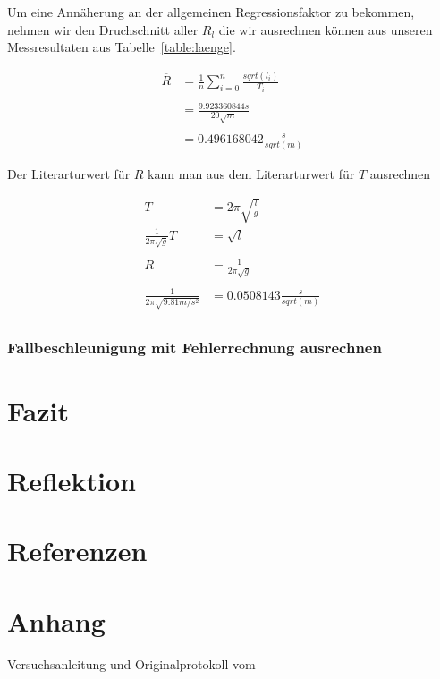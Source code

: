 \documentclass[12pt, a4paper, twoside]{article}
\begin{document}
Um eine Annäherung an der allgemeinen Regressionsfaktor zu bekommen,
nehmen wir den Druchschnitt aller $R_l$ die wir ausrechnen können aus unseren Messresultaten aus Tabelle~\ref{table:laenge}.

\begin{align*}
  \overline{R} & = \frac{1}{n}\sum_{i=0}^{n} \frac{sqrt(l_i)}{T_i} \\
  \\
               & = \frac{9.923360844s}{20\sqrt{m}}                 \\
  \\
               & = 0.496168042\frac{s}{sqrt(m)}
\end{align*}

\begin{center}
\end{center}

Der Literarturwert für $R$ kann man aus dem Literarturwert für $T$ ausrechnen

\begin{align*}
  T                               & = 2\pi \sqrt{\frac{l}{g}}    \\
  \frac{1}{2\pi \sqrt{g}}T        & = \sqrt{l}                   \\
  \\
  R                               & = \frac{1}{2\pi \sqrt{g}}    \\
  \\
  \frac{1}{2\pi \sqrt{9.81m/s^2}} & = 0.0508143\frac{s}{sqrt(m)} \\
\end{align*}

\subsubsection{Fallbeschleunigung mit Fehlerrechnung ausrechnen}

\section{Fazit}
\section{Reflektion}
\section{Referenzen}
\printbibliography[heading=none]
\section{Anhang}
Versuchsanleitung und Originalprotokoll vom \labdate
\end{document}
